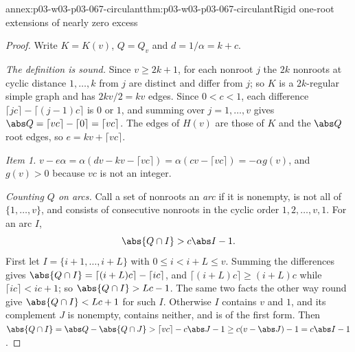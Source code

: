 \begin{annexitem}{annex:p03-w03-p03-067-circulant}{thm:p03-w03-p03-067-circulant}{Rigid one-root extensions of nearly zero excess}
\begin{proof}
Write \(K=K(v)\), \(Q=Q_v\) and \(d=1/\alpha=k+c\).

\emph{The definition is sound.}  Since \(v\geq2k+1\), for each nonroot \(j\)
the \(2k\) nonroots at cyclic distance \(1,\ldots,k\) from \(j\) are
distinct and differ from \(j\); so \(K\) is a \(2k\)-regular simple graph
and has \(2kv/2=kv\) edges.  Since \(0<c<1\), each difference
\(\lceil jc\rceil-\lceil(j-1)c\rceil\) is \(0\) or \(1\), and summing over
\(j=1,\ldots,v\) gives \(\abs Q=\lceil vc\rceil-\lceil0\rceil=\lceil
vc\rceil\).  The edges of \(H(v)\) are those of \(K\) and the \(\abs Q\) root
edges, so \(e=kv+\lceil vc\rceil\).

\emph{Item 1.}  \(v-e\alpha=\alpha(dv-kv-\lceil vc\rceil)=\alpha(cv-\lceil
vc\rceil)=-\alpha g(v)\), and \(g(v)>0\) because \(vc\) is not an integer.

\emph{Counting \(Q\) on arcs.}  Call a set of nonroots an \emph{arc} if it is
nonempty, is not all of \(\{1,\ldots,v\}\), and consists of consecutive
nonroots in the cyclic order \(1,2,\ldots,v,1\).  For an arc \(I\),
\[
 \abs{Q\cap I}>c\abs I-1.
\]
First let \(I=\{i+1,\ldots,i+L\}\) with \(0\leq i<i+L\leq v\).  Summing the
differences gives \(\abs{Q\cap I}=\lceil(i+L)c\rceil-\lceil ic\rceil\), and
\(\lceil(i+L)c\rceil\geq(i+L)c\) while \(\lceil ic\rceil<ic+1\); so
\(\abs{Q\cap I}>Lc-1\).  The same two facts the other way round give
\(\abs{Q\cap I}<Lc+1\) for such \(I\).  Otherwise \(I\) contains \(v\) and
\(1\), and its complement \(J\) is nonempty, contains neither, and is of the
first form.  Then
\(\abs{Q\cap I}=\abs Q-\abs{Q\cap J}>\lceil vc\rceil-c\abs J-1\geq
c(v-\abs J)-1=c\abs I-1\).


\end{proof}
\end{annexitem}
